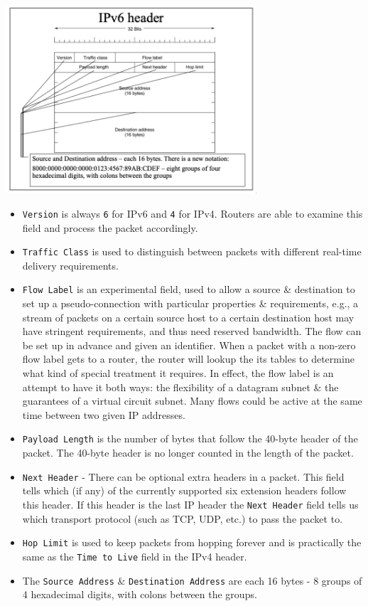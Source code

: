 \documentclass[11pt]{article}
\begin{document}
\begin{center}
    \includegraphics[width=0.7\textwidth]{ipv6header.png}
\end{center}
\begin{itemize}
    \item   \verb|Version| is always \verb|6| for IPv6 and \verb|4| for IPv4.
            Routers are able to examine this field and process the packet accordingly.
    \item   \verb|Traffic Class| is used to distinguish between packets with different real-time delivery requirements.
    \item   \verb|Flow Label| is an experimental field, used to allow a source \& destination to set up a pseudo-connection with particular properties \& requirements, e.g., a stream of packets on a certain 
            source host to a certain destination host may have stringent requirements, and thus need reserved bandwidth.
            The flow can be set up in advance and given an identifier.
            When a packet with a non-zero flow label gets to a router, the router will lookup the its tables to determine what kind of special treatment it requires.
            In effect, the flow label is an attempt to have it both ways: the flexibility of a datagram subnet \& the guarantees of a virtual circuit subnet. 
            Many flows could be active at the same time between two given IP addresses.
    \item   \verb|Payload Length| is the number of bytes that follow the 40-byte header of the packet.
            The 40-byte header is no longer counted in the length of the packet.
    \item   \verb|Next Header| - There can be optional extra headers in a packet.
            This field tells which (if any) of the currently supported six extension headers follow this header.
            If this header is the last IP header the \verb|Next Header| field tells us which transport protocol (such as TCP, UDP, etc.) to pass the packet to.
    \item   \verb|Hop Limit| is used to keep packets from hopping forever and is practically the same as the \verb|Time to Live| field in the IPv4 header.
    \item   The \verb|Source Address| \& \verb|Destination Address| are each 16 bytes - 8 groups of 4 hexadecimal digits, with colons between the groups.
\end{itemize}
\end{document}
